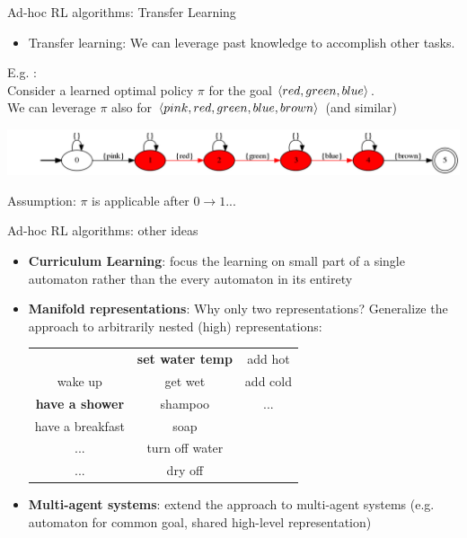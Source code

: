 \documentclass{beamer}
\begin{document}
\begin{frame}{Ad-hoc RL algorithms: Transfer Learning}
	\begin{itemize}
		\item Transfer learning: We can leverage past knowledge to accomplish other tasks.
	\end{itemize}
	E.g. \Sapientino:\\
	Consider a learned optimal policy $\pi$ for the goal $\langle red, green, blue \rangle$.\\
	We can leverage $\pi$ also for $\langle pink, red, green, blue, brown \rangle$ (and similar)
	
	\begin{center}
	\includegraphics[width=\textwidth]{images/sapientino-composite-dfa-horizontal}
	\end{center}
	
	Assumption: $\pi$ is applicable after $0 \rightarrow 1$...
\end{frame}

\begin{frame}{Ad-hoc RL algorithms: other ideas}

	\begin{itemize}
		\item \textbf{Curriculum Learning}: focus the learning on small part of a single automaton rather than the every automaton in its entirety
		\item \textbf{Manifold representations}: Why only two representations? Generalize the approach to arbitrarily nested (high) representations:
		
		\begin{table}
			\begin{tabular}{c | c | c}
				& \textbf{set water temp} 	& add hot\\
				wake up		 		      & get wet 				    & add cold\\
				\textbf{have a shower}	  & shampoo 				    & ...\\
				have a breakfast	  	  & soap 					    & \\
				...						  & turn off water 			    & \\
				...						  & dry off 				    & 
			\end{tabular}
		\end{table}
		
		\item \textbf{Multi-agent systems}: extend the approach to multi-agent systems (e.g. automaton for common goal, shared high-level representation)
	\end{itemize}
		
\end{frame}
\end{document}
